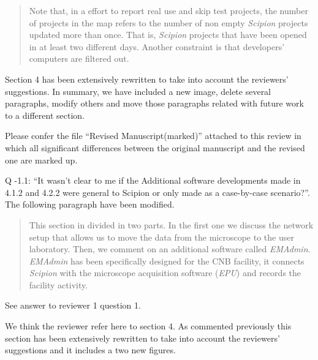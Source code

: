 \documentclass[a4paper,12pt]{article}
\def\cnb{CNB\xspace}
\def\scipion{\textit{Scipion}\xspace}
\def\emadmin{\textit{EMAdmin}\xspace}
\def\epu{\textit{EPU}\xspace}
\def\cnb{CNB\xspace}
\begin{document}
\begin{reviewer}
\begin{quote}
Note that, in a effort to report real use and skip test projects, the number of projects in the map refers to the number of non empty \scipion projects updated more than once. That is, 
\scipion projects that have been opened in at least two different days. Another constraint is that developers' computers are filtered out.
\end{quote}



\reply Section 4 has been extensively rewritten to take into account the reviewers' suggestions. In summary, we have included a new image, delete several paragraphs, modify others and move those paragraphs related with future work to a different section.

Please confer the file ``Revised Manuscript(marked)'' attached to this review in which 
all significant differences between the original manuscript and the revised one are marked up.

Q \the\numexpr\value{pointcounter}-1\relax.1: ``It wasn't clear to me if the Additional software developments made in 4.1.2 and 4.2.2 were general to Scipion or only made as a case-by-case scenario?''. The following paragraph have been modified.

\begin{quote}
 This section in divided in two parts. In the first one we discuss the network setup that allows us to move the data from the microscope to the user laboratory. Then,  we comment on an additional software called  \emadmin. \emadmin has been specifically designed for the \cnb facility, it connects \scipion with the microscope acquisition software (\epu) and records the facility activity.
\end{quote}



\reply See answer to reviewer 1 question 1. 


\reply We think the reviewer refer here to section 4. As commented previously this section has been extensively rewritten to take into account the reviewers' suggestions and it includes a two new figures.

\end{reviewer}
\end{document}

